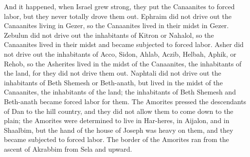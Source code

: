 \begin{biblechapter}
\verse And it happened, when Israel grew strong, they put the Canaanites to forced labor, but they never totally drove them out.
\verse Ephraim did not drive out the Canaanites living in Gezer, so the Canaanites lived in their midst in Gezer.
\verse Zebulun did not drive out the inhabitants of Kitron or Nahalol, so the Canaanites lived in their midst and became subjected to forced labor.
\verse Asher did not drive out the inhabitants of Acco, Sidon, Ahlab, Aczib, Helbah, Aphik, or Rehob,
\verse so the Asherites lived in the midst of the Canaanites, the inhabitants of the land, for they did not drive them out.
\verse Naphtali did not drive out the inhabitants of Beth Shemesh or Beth-anath, but lived in the midst of the Canaanites, the inhabitants of the land; the inhabitants of Beth Shemesh and Beth-anath became forced labor for them.
\verse The Amorites pressed the descendants of Dan to the hill country, and they did not allow them to come down to the plain;
\verse the Amorites were determined to live in Har-heres, in Aijalon, and in Shaalbim, but the hand of the house of Joseph was heavy on them, and they became subjected to forced labor.
\verse The border of the Amorites ran from the ascent of Akrabbim from Sela and upward.
\end{biblechapter}


